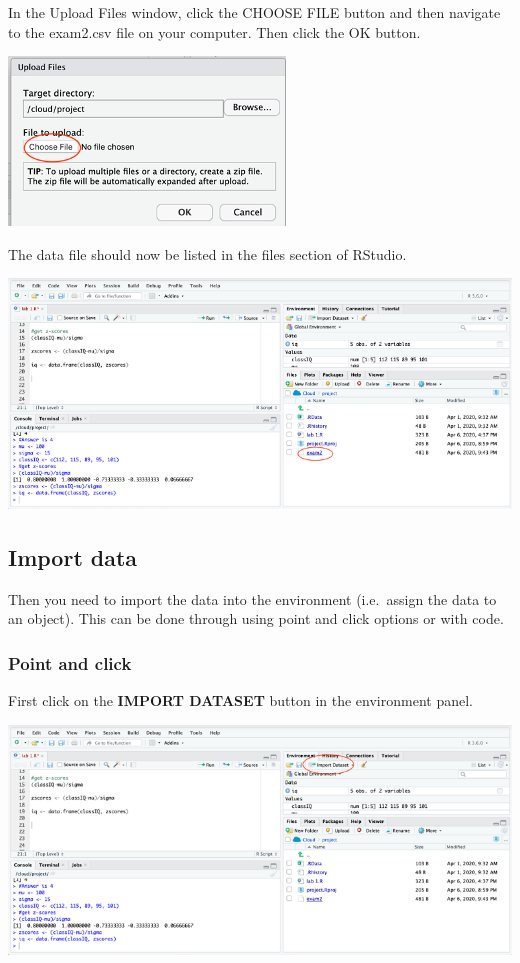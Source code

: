 \documentclass[
]{book}
\begin{document}
In the Upload Files window, click the CHOOSE FILE button and then navigate to the exam2.csv file on your computer. Then click the OK button.

\includegraphics{img/choosefile.png}

The data file should now be listed in the files section of RStudio.

\includegraphics{img/filelist.png}

\hypertarget{import-data}{%
\subsection{Import data}\label{import-data}}

Then you need to import the data into the environment (i.e.~assign the data to an object). This can be done through using point and click options or with code.

\hypertarget{point-and-click}{%
\subsubsection{Point and click}\label{point-and-click}}

First click on the \textbf{IMPORT DATASET} button in the environment panel.

\includegraphics{img/import.png}
\end{document}
